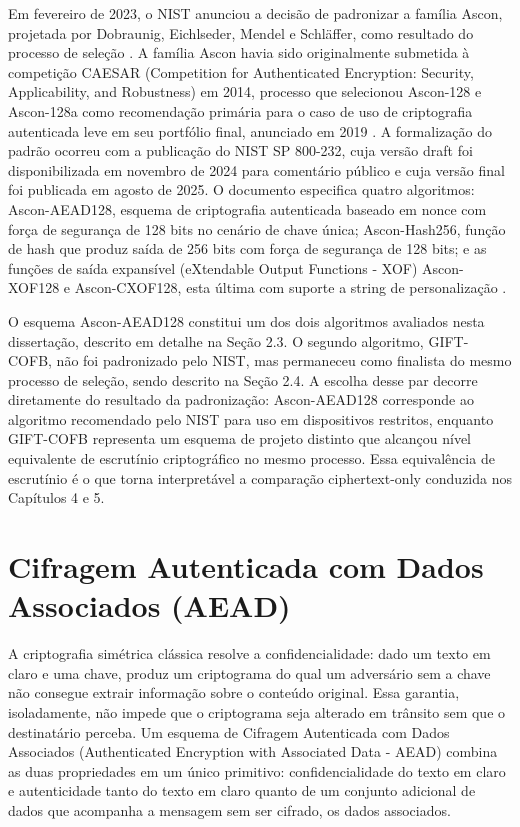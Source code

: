 Em fevereiro de 2023, o NIST anunciou a decisão de padronizar a família Ascon, projetada por Dobraunig, Eichlseder, Mendel e Schläffer, como resultado do processo de seleção \cite{nist_lwc_finalreport_2023}. A família Ascon havia sido originalmente submetida à competição CAESAR (Competition for Authenticated Encryption: Security, Applicability, and Robustness) em 2014, processo que selecionou Ascon-128 e Ascon-128a como recomendação primária para o caso de uso de criptografia autenticada leve em seu portfólio final, anunciado em 2019 \cite{cesar}. A formalização do padrão ocorreu com a publicação do NIST SP 800-232, cuja versão draft foi disponibilizada em novembro de 2024 para comentário público e cuja versão final foi publicada em agosto de 2025. O documento especifica quatro algoritmos: Ascon-AEAD128, esquema de criptografia autenticada baseado em nonce com força de segurança de 128 bits no cenário de chave única; Ascon-Hash256, função de hash que produz saída de 256 bits com força de segurança de 128 bits; e as funções de saída expansível (eXtendable Output Functions - XOF) Ascon-XOF128 e Ascon-CXOF128, esta última com suporte a string de personalização \cite{nist_sp800232_2025}.

O esquema Ascon-AEAD128 constitui um dos dois algoritmos avaliados nesta dissertação, descrito em detalhe na Seção 2.3. O segundo algoritmo, GIFT-COFB, não foi padronizado pelo NIST, mas permaneceu como finalista do mesmo processo de seleção, sendo descrito na Seção 2.4. A escolha desse par decorre diretamente do resultado da padronização: Ascon-AEAD128 corresponde ao algoritmo recomendado pelo NIST para uso em dispositivos restritos, enquanto GIFT-COFB representa um esquema de projeto distinto que alcançou nível equivalente de escrutínio criptográfico no mesmo processo. Essa equivalência de escrutínio é o que torna interpretável a comparação ciphertext-only conduzida nos Capítulos 4 e 5.



\section{Cifragem Autenticada com Dados Associados (AEAD)}

A criptografia simétrica clássica resolve a confidencialidade: dado um texto em claro e uma chave, produz um criptograma do qual um adversário sem a chave não consegue extrair informação sobre o conteúdo original. Essa garantia, isoladamente, não impede que o criptograma seja alterado em trânsito sem que o destinatário perceba. Um esquema de Cifragem Autenticada com Dados Associados (Authenticated Encryption with Associated Data - AEAD) combina as duas propriedades em um único primitivo: confidencialidade do texto em claro e autenticidade tanto do texto em claro quanto de um conjunto adicional de dados que acompanha a mensagem sem ser cifrado, os dados associados.


